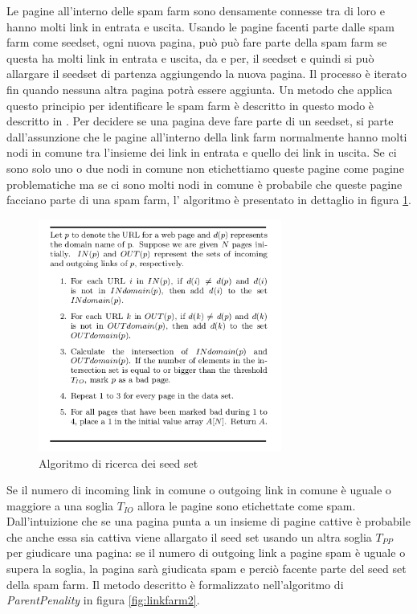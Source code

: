 Le pagine all'interno delle spam farm sono densamente connesse tra di loro e hanno molti link in entrata e uscita. Usando le pagine facenti parte dalle spam farm come seedset, ogni nuova pagina, può può fare parte della spam farm se questa ha molti link in entrata e uscita, da e per, il seedset e quindi si può allargare il seedset di partenza aggiungendo la nuova pagina. Il processo è iterato fin quando nessuna altra pagina potrà essere aggiunta. Un metodo che applica questo principio per identificare le spam farm è descritto in questo modo è descritto in \cite{Wu05identifyinglink}. Per decidere se una pagina deve fare parte di un seedset, si parte dall'assunzione che le pagine all'interno della link farm normalmente hanno molti nodi in comune tra l'insieme dei link in entrata e quello dei link in uscita. Se ci sono solo uno o due nodi in comune non etichettiamo queste pagine come pagine problematiche ma se ci sono molti nodi in comune è probabile che queste pagine facciano parte di una spam farm, l'
algoritmo è presentato in dettaglio in figura \ref{fig:linkfarm1}. 
\begin{figure}
\centering
\includegraphics[width=8cm]{immagini/linkfarm/immagine1.png}
\caption{Algoritmo di ricerca dei seed set}
\label{fig:linkfarm1}
\end{figure}
Se il numero di incoming link in comune o outgoing link in comune è  uguale o maggiore a una soglia \(T_{IO}\) allora le pagine sono etichettate come spam.  Dall'intuizione che se una pagina punta a un insieme di pagine cattive è probabile che anche essa sia cattiva viene allargato il seed set usando un altra soglia \(T_{PP}\) per giudicare una pagina: se il numero di outgoing link a pagine spam è uguale o supera la soglia, la pagina sarà giudicata spam e perciò facente parte del seed set della spam farm. Il metodo descritto è formalizzato nell'algoritmo di \textit{ParentPenality} in figura \ref{fig:linkfarm2}.
